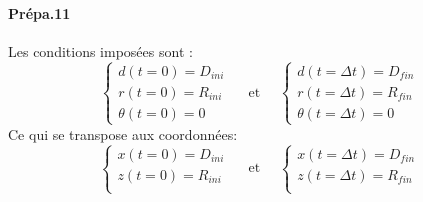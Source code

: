 \documentclass[10pt,a4paper,notitlepage]{article}
\begin{document}
\paragraph{Prépa.11}
Les conditions imposées sont :
\begin{equation}
  \begin{cases}
    d(t=0) = D_{ini} \\
    r(t=0) = R_{ini} \\
    \theta(t=0) = 0
  \end{cases} \quad\text{ et }\quad
  \begin{cases}
    d(t=\Delta t ) = D_{fin} \\
    r(t=\Delta t ) = R_{fin} \\
    \theta(t=\Delta t ) = 0
  \end{cases}
\end{equation}
Ce qui se transpose aux coordonnées:
\begin{equation}
  \begin{cases}
    x(t=0) = D_{ini}\\
    z(t=0) = R_{ini} \\
  \end{cases} \quad\text{ et }\quad
  \begin{cases}
    x(t=\Delta t) = D_{fin}\\
    z(t=\Delta t) = R_{fin} \\
  \end{cases}
\end{equation}
\end{document}
